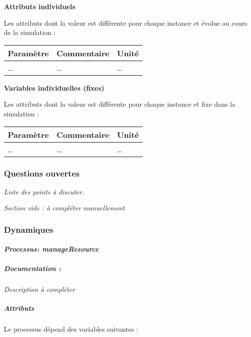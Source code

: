 \documentclass[
]{article}
\begin{document}
\textbf{Attributs individuels}

Les attributs dont la valeur est différente pour chaque instance et
évolue au cours de la simulation :

\begin{longtable}[]{@{}lll@{}}
\toprule\noalign{}
\textbf{Paramètre} & \textbf{Commentaire} & \textbf{Unité} \\
\midrule\noalign{}
\endhead
\bottomrule\noalign{}
\endlastfoot
\ldots{} & \ldots{} & \ldots{} \\
\end{longtable}

\textbf{Variables individuelles (fixes)}

Les attributs dont la valeur est différente pour chaque instance et fixe
dans la simulation :

\begin{longtable}[]{@{}lll@{}}
\toprule\noalign{}
\textbf{Paramètre} & \textbf{Commentaire} & \textbf{Unité} \\
\midrule\noalign{}
\endhead
\bottomrule\noalign{}
\endlastfoot
\ldots{} & \ldots{} & \ldots{} \\
\end{longtable}

\subsubsection{Questions ouvertes}\label{questions-ouvertes-1}

\emph{Liste des points à discuter.}

\emph{Section vide : à compléter manuellement}

\subsubsection{Dynamiques}\label{dynamiques-1}

\paragraph{\texorpdfstring{\emph{Processus:
manageResource}}{Processus: manageResource}}\label{processus-manageresource}

\subparagraph{Documentation :}\label{documentation-2}

\emph{Description à compléter}

\subparagraph{Attributs}\label{attributs-2}

Le processus dépend des variables suivantes :
\end{document}
